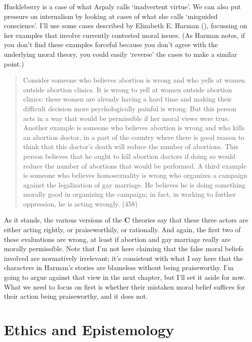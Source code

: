 \documentclass[
  10pt,
  letterpaper,
  twoside]{scrbook}
\begin{document}
{Huck}leberry is a case of what Arpaly calls `inadvertent virtue'. We
can also put pressure on internalism by looking at cases of what she
calls `misguided conscience'. I'll use some cases described by Elizabeth
E. Harman (), focussing on her examples
that involve currently contested moral issues. (As Harman notes, if you
don't find these examples forceful because you don't agree with the
underlying moral theory, you could easily `reverse' the cases to make a
similar point.)

\begin{quote}
Consider someone who believes abortion is wrong and who yells at women
outside abortion clinics. It is wrong to yell at women outside abortion
clinics: these women are already having a hard time and making their
difficult decision more psychologically painful is wrong. But this
person acts in a way that would be permissible if her moral views were
true. Another example is someone who believes abortion is wrong and who
kills an abortion doctor, in a part of the country where there is good
reason to think that this doctor's death will reduce the number of
abortions. This person believes that he ought to kill abortion doctors
if doing so would reduce the number of abortions that would be
performed. A third example is someone who believes homosexuality is
wrong who organizes a campaign against the legalization of gay marriage.
He believes he is doing something morally good in organizing the
campaign; in fact, in working to further oppression, he is acting
wrongly. (458)
\end{quote}

As it stands, the various versions of the \textbf{C} theories say that
these three actors are either acting rightly, or praiseworthily, or
rationally. And again, the first two of these evaluations are wrong, at
least if abortion and gay marriage really are morally permissible. Note
that I'm not here claiming that the false moral beliefs involved are
normatively irrelevant; it's consistent with what I say here that the
characters in Harman's stories are blameless without being praiseworthy.
I'm going to argue against that view in the next chapter, but I'll set
it aside for now. What we need to focus on first is whether their
mistaken moral belief suffices for their action being praiseworthy, and
it does not.

\section{Ethics and Epistemology}\label{ethicsandepistemology}
\end{document}
